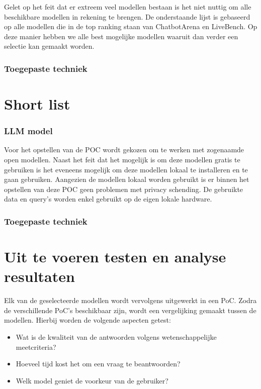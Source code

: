 Gelet op het feit dat er extreem veel modellen bestaan is het niet nuttig om alle beschikbare modellen in rekening te brengen. De onderstaande lijst is gebaseerd op alle modellen die in de top ranking staan van ChatbotArena en LiveBench. Op deze manier hebben we alle best mogelijke modellen waaruit dan verder een selectie kan gemaakt worden. 

\subsubsection{Toegepaste techniek}

\section{Short list}

\subsubsection{LLM model}

Voor het opstellen van de POC wordt gekozen om te werken met zogenaamde open modellen. Naast het feit dat het mogelijk is om deze modellen gratis te gebruiken is het eveneens mogelijk om deze modellen lokaal te installeren en te gaan gebruiken. Aangezien de modellen lokaal worden gebruikt is er binnen het opstellen van deze POC geen problemen met privacy schending. De gebruikte data en query's worden enkel gebruikt op de eigen lokale hardware.

\subsubsection{Toegepaste techniek}


\section{Uit te voeren testen en analyse resultaten}

Elk van de geselecteerde modellen wordt vervolgens uitgewerkt in een PoC. Zodra de verschillende PoC’s beschikbaar zijn, wordt een vergelijking gemaakt tussen de modellen. Hierbij worden de volgende aspecten getest:

\begin{itemize}
    \item Wat is de kwaliteit van de antwoorden volgens wetenschappelijke meetcriteria?
    \item Hoeveel tijd kost het om een vraag te beantwoorden?
    \item Welk model geniet de voorkeur van de gebruiker?
\end{itemize}

